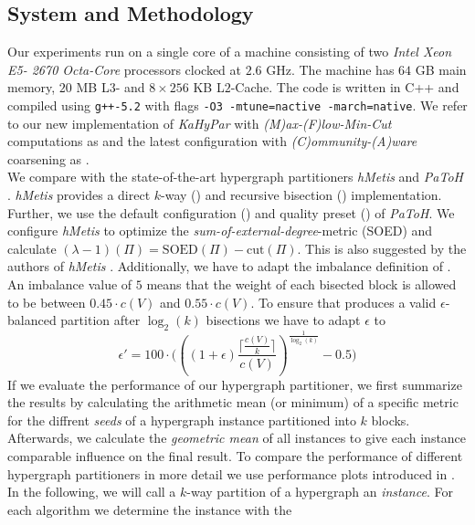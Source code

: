 \subsection{System and Methodology}
\label{sec:methodology}

Our experiments run on a single core of a machine consisting of two \emph{Intel Xeon E5-
2670 Octa-Core} processors clocked at $2.6$ GHz. The machine has $64$ GB main memory,
$20$ MB L$3$- and $8\times256$ KB L$2$-Cache. The code is written in C++ and compiled using
\lstinline{g++-5.2} with flags \lstinline{-O3 -mtune=nactive -march=native}. We refer to
our new implementation of \emph{KaHyPar} with \emph{(M)ax-(F)low-Min-Cut} computations 
as  and the latest configuration with \emph{(C)ommunity-(A)ware} coarsening as
. \\
We compare  with the state-of-the-art hypergraph partitioners \emph{hMetis} 
\cite{karypis1999multilevel,karypis2000multilevel} and \emph{PaToH} \cite{catalyurek1999hypergraph}.
\emph{hMetis} provides a direct $k$-way () and recursive bisection () implementation.
Further, we use the default configuration () and quality preset () of
\emph{PaToH}. We configure \emph{hMetis} to optimize the \emph{sum-of-external-degree}-metric
(SOED) and calculate $(\lambda-1)(\Pi) = \text{SOED}(\Pi) - \text{cut}(\Pi)$. This is also
suggested by the authors of \emph{hMetis} \cite{karypis2000multilevel}. Additionally, we have
to adapt the imbalance definition of . An imbalance value of $5$ means that the weight
of each bisected block is allowed to be between $0.45 \cdot c(V)$ and $0.55 \cdot c(V)$.
To ensure that  produces a valid $\epsilon$-balanced partition after $\log_2(k)$
bisections we have to adapt $\epsilon$ to
\[\epsilon' = 100 \cdot \Bigg( \left( (1 + \epsilon) \frac{\lceil \frac{c(V)}{k} \rceil}{c(V)} \right)^{\frac{1}{\log_2(k)}} - 0.5 \Bigg)\]
If we evaluate the performance of our hypergraph partitioner,
we first summarize the results by calculating the arithmetic mean (or minimum) of a specific metric
for the diffrent \emph{seeds} of a hypergraph instance partitioned into $k$ blocks. 
Afterwards, we calculate the \emph{geometric mean} of 
all instances to give each instance comparable influence on the final result. 
To compare the performance of different hypergraph partitioners in more detail
we use performance plots introduced in \cite{schlag2016k}.
In the following, we will call a $k$-way partition of a hypergraph an \emph{instance}.
For each algorithm we determine the instance with the 
